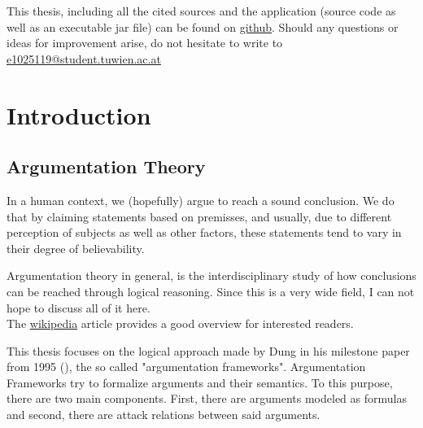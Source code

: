 \documentclass[12pt]{report}
\numberwithin{figure}{chapter}
\theoremstyle{break}
\newtheorem{elab}{Elaboration}[chapter]
\begin{document}
This thesis, including all the cited sources and the application (source code as well as an executable jar file) can be found on \href{https://github.com/e1025119/thesis}{github}.
Should any questions or ideas for improvement arise, do not hesitate to write to \href{mailto:e1025119@student.tuwien.ac.at}{e1025119@student.tuwien.ac.at}

\raggedright %
\chapter{Introduction}


\section{Argumentation Theory}
In a human context, we (hopefully) argue to reach a sound conclusion. We do that by claiming statements 
based on premisses, and usually, due to different perception of subjects as well as other factors,
these statements tend to vary in their degree of believability.

Argumentation theory in general, is the interdisciplinary study of how conclusions can be reached  through logical reasoning.
Since this is a very wide field, I can not hope to discuss all of it here.\\
 The \href{http://en.wikipedia.org/wiki/Argumentation_theory}{wikipedia} article provides a good overview
for interested readers.

This thesis focuses on the logical approach made by Dung in his milestone paper from 1995 (\cite{Dung}),
the so called "argumentation frameworks".
Argumentation Frameworks try to formalize arguments and their semantics.
To this purpose, there are two main components. First, there are arguments modeled as formulas and second, there are attack relations between said arguments.
\end{document}
